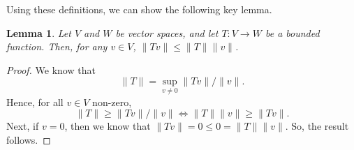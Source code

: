 \documentclass[a4paper, openany]{memoir}
\theoremstyle{definition}
\theoremstyle{plain}
\newtheorem{lemma}[definition]{Lemma}
\begin{document}
    \noindent Using these definitions, we can show the following key lemma.
    \begin{lemma}
        Let $V$ and $W$ be vector spaces, and let $T \colon V \to W$ be a bounded function. Then, for any $v \in V$, $\lVert Tv \rVert \leq \lVert T \rVert \lVert v \rVert$.
    \end{lemma}
    \begin{proof}
        We know that 
        \[\lVert T \rVert = \sup_{v \neq 0 } \lVert Tv \rVert/\lVert v \rVert.\]
        Hence, for all $v \in V$ non-zero,
        \[\lVert T \rVert \geq \lVert Tv \rVert/\lVert v \rVert \iff \lVert T \rVert \lVert v \rVert \geq \lVert Tv \rVert.\]
        Next, if $v = 0$, then we know that $\lVert Tv \rVert = 0 \leq 0 = \lVert T \rVert \lVert v \rVert$. So, the result follows.
    \end{proof}
\end{document}
